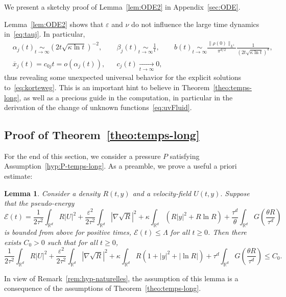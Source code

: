\documentclass[11pt]{article}
\newtheorem{lemm}[theo]{Lemma}
\theoremstyle{definition}
\numberwithin{equation}{section}
\numberwithin{figure}{section}
\numberwithin{table}{section}
\newcommand*\R{\mathbb{R}}
\newcommand*\<{\left\langle}
\renewcommand*\>{\right\rangle}
\renewcommand*\le{\leqslant}
\renewcommand*\ge{\geqslant}
\newcommand*\Eq[2]{\mathop{\sim}\limits_{#1\rightarrow#2}}
\newcommand*\Tend[2]{\mathop{\longrightarrow}\limits_{#1\rightarrow#2}}
\newcommand*\eps{\varepsilon}
\begin{document}
We present a sketchy proof of Lemma~\ref{lem:ODE2} in Appendix~\ref{sec:ODE}.

Lemma~\ref{lem:ODE2} shows that $\eps$ and $\nu$ do not influence the large time dynamics in~\eqref{eq:tauj}. In particular,
\[
\begin{aligned}
&\alpha_j(t)\Eq t \infty \left(2t\sqrt{\kappa \ln t}\right)^{-2},&&
\beta_j(t)\Eq t \infty \frac{1}{t}, && b(t)\Eq t \infty \frac{\|\rho(0)\|_{L^1}}{\pi^{d/2}}\frac{1}{(2t\sqrt{\kappa \ln t})^{d}},\\
& \overline x_j(t)=c_{0j}t=o\left(\alpha_j(t)\right),&& c_j(t)\Tend t \infty 0,
\end{aligned}
\]
thus revealing some unexpected universal behavior for the explicit solutions to~\eqref{eq:korteweg}. This is an important hint to believe in Theorem~\ref{theo:temps-long}, as well as a precious guide in the computation, in particular in the derivation of the change of unknown functions~\eqref{eq:uvFluid}.


\subsection{Proof of Theorem~\ref{theo:temps-long}}\label{sec:convergence}

For the end of this section, we consider a pressure $P$ satisfying Assumption~\ref{hyp:P-temps-long}. As a preamble, we prove a useful a priori estimate:

\begin{lemm}\label{lem:aprioriE}
Consider a density $R(t,y)$ and a velocity-field $U(t,y).$ Suppose that the pseudo-energy
\begin{equation*}
\mathcal E(t) = \frac{1}{2\tau^2}\int_{\R^d} R|U|^2+\frac{\eps^2}{2\tau^2} \int_{\R^d}|\nabla \sqrt R|^2 +\kappa\int_{\R^d} (R|y|^2 + R \ln R) +
\frac{\tau^d}{\theta}\int_{\R^d} G\left(\frac{ \theta R}{\tau^d}\right)
\end{equation*}
is bounded from above for positive times, $\mathcal E(t)\le
\Lambda$ for all $t\ge 0$. Then there exists $C_0>0$ such that for all $t\ge 0$,
\begin{equation*}
\frac{1}{2\tau^2}\int_{\R^d} R|U|^2 +\frac{\eps^2}{2\tau^2} \int_{\R^d}|\nabla \sqrt R|^2 + \kappa \int_{\R^d} R (1+|y|^2 + |\ln R|) +
\tau^d\int_{\R^d} G\left(\frac{ \theta R}{\tau^d}\right)
\le C_0.
\end{equation*}
\end{lemm}

In view of Remark~\ref{rem:hyp-naturelles}, the assumption of this lemma is a consequence of the assumptions of Theorem~\ref{theo:temps-long}.
\end{document}
